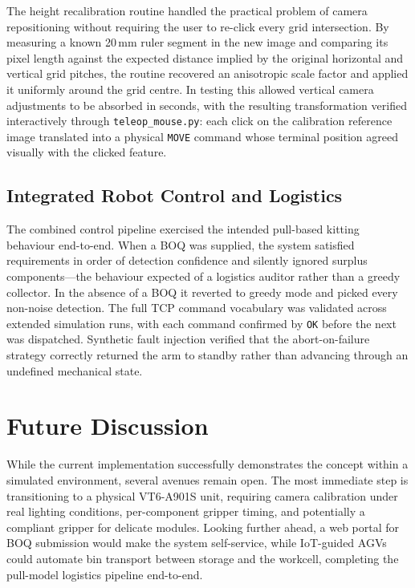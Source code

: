 \documentclass{MIPRO}
\begin{document}
The height recalibration routine handled the practical problem of camera repositioning without requiring the user to re-click every grid intersection. By measuring a known 20\,mm ruler segment in the new image and comparing its pixel length against the expected distance implied by the original horizontal and vertical grid pitches, the routine recovered an anisotropic scale factor and applied it uniformly around the grid centre. In testing this allowed vertical camera adjustments to be absorbed in seconds, with the resulting transformation verified interactively through \texttt{teleop\_mouse.py}: each click on the calibration reference image translated into a physical \texttt{MOVE} command whose terminal position agreed visually with the clicked feature.

\subsection{Integrated Robot Control and Logistics}

The combined control pipeline exercised the intended pull-based kitting behaviour end-to-end. When a BOQ was supplied, the system satisfied requirements in order of detection confidence and silently ignored surplus components---the behaviour expected of a logistics auditor rather than a greedy collector. In the absence of a BOQ it reverted to greedy mode and picked every non-noise detection. The full TCP command vocabulary was validated across extended simulation runs, with each command confirmed by \texttt{OK} before the next was dispatched. Synthetic fault injection verified that the abort-on-failure strategy correctly returned the arm to standby rather than advancing through an undefined mechanical state.

\section{Future Discussion}

While the current implementation successfully demonstrates the concept within a simulated environment, several avenues remain open. The most immediate step is transitioning to a physical VT6-A901S unit, requiring camera calibration under real lighting conditions, per-component gripper timing, and potentially a compliant gripper for delicate modules. Looking further ahead, a web portal for BOQ submission would make the system self-service, while IoT-guided AGVs~\cite{vlachos} could automate bin transport between storage and the workcell, completing the pull-model logistics pipeline end-to-end.
\end{document}
